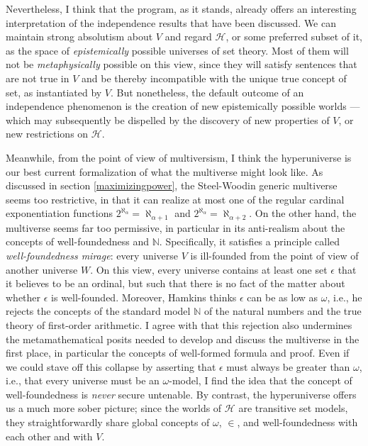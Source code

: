 \documentclass[letterpaper,12pt]{article}
\newcommand{\N}{\mathbb{N}}
\begin{document}
Nevertheless, I think that the program, as it stands, already offers an interesting interpretation of the independence results that have been discussed. We can maintain strong absolutism about $V$ and regard $\mathcal{H}$, or some preferred subset of it, as the space of \emph{epistemically} possible universes of set theory. Most of them will not be \emph{metaphysically} possible on this view, since they will satisfy sentences that are not true in $V$ and be thereby incompatible with the unique true concept of set, as instantiated by $V$. But nonetheless, the default outcome of an independence phenomenon is the creation of new epistemically possible worlds --- which may subsequently be dispelled by the discovery of new properties of $V$, or new restrictions on $\mathcal{H}$.

Meanwhile, from the point of view of multiversism, I think the hyperuniverse is our best current formalization of what the multiverse might look like. As discussed in section \ref{maximizingpower}, the Steel-Woodin generic multiverse seems too restrictive, in that it can realize at most one of the regular cardinal exponentiation functions $2^{\aleph_\alpha} = \aleph_{\alpha + 1}$ and $2^{\aleph_\alpha} = \aleph_{\alpha + 2}$. On the other hand, the \cite{hamkins2012set} multiverse seems far too permissive, in particular in its anti-realism about the concepts of well-foundedness and $\mathbb{N}$. Specifically, it satisfies a principle called \emph{well-foundedness mirage}: every universe $V$ is ill-founded from the point of view of another universe $W$. On this view, every universe contains at least one set $\epsilon$ that it believes to be an ordinal, but such that there is no fact of the matter about whether $\epsilon$ is well-founded. Moreover, Hamkins thinks $\epsilon$ can be as low as $\omega$, i.e., he rejects the concepts of the standard model $\N$ of the natural numbers and the true theory of first-order arithmetic. I agree with \cite{barton2016multiversism} that this rejection also undermines the metamathematical posits needed to develop and discuss the multiverse in the first place, in particular the concepts of well-formed formula and proof. Even if we could stave off this collapse by asserting that $\epsilon$ must always be greater than $\omega$, i.e., that every universe must be an $\omega$-model, I find the idea that the concept of well-foundedness is \emph{never} secure untenable. By contrast, the hyperuniverse offers us a much more sober picture; since the worlds of $\mathcal{H}$ are transitive set models, they straightforwardly share global concepts of $\omega$, $\in$, and well-foundedness with each other and with $V$.
\end{document}
